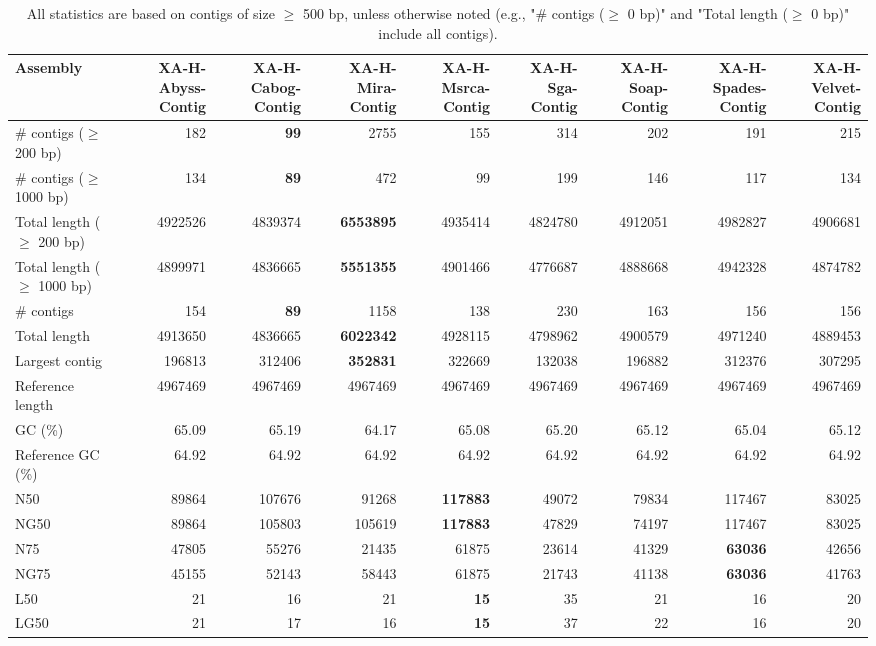 \documentclass[12pt,a4paper]{article}
\begin{document}
\begin{table}[ht]
\begin{center}
\caption{All statistics are based on contigs of size $\geq$ 500 bp, unless otherwise noted (e.g., "\# contigs ($\geq$ 0 bp)" and "Total length ($\geq$ 0 bp)" include all contigs).}
\begin{tabular}{|l*{8}{|r}|}
\hline
Assembly & XA-H-Abyss-Contig & XA-H-Cabog-Contig & XA-H-Mira-Contig & XA-H-Msrca-Contig & XA-H-Sga-Contig & XA-H-Soap-Contig & XA-H-Spades-Contig & XA-H-Velvet-Contig \\ \hline
\# contigs ($\geq$ 200 bp) & 182 & {\bf 99} & 2755 & 155 & 314 & 202 & 191 & 215 \\ \hline
\# contigs ($\geq$ 1000 bp) & 134 & {\bf 89} & 472 & 99 & 199 & 146 & 117 & 134 \\ \hline
Total length ($\geq$ 200 bp) & 4922526 & 4839374 & {\bf 6553895} & 4935414 & 4824780 & 4912051 & 4982827 & 4906681 \\ \hline
Total length ($\geq$ 1000 bp) & 4899971 & 4836665 & {\bf 5551355} & 4901466 & 4776687 & 4888668 & 4942328 & 4874782 \\ \hline
\# contigs & 154 & {\bf 89} & 1158 & 138 & 230 & 163 & 156 & 156 \\ \hline
Total length & 4913650 & 4836665 & {\bf 6022342} & 4928115 & 4798962 & 4900579 & 4971240 & 4889453 \\ \hline
Largest contig & 196813 & 312406 & {\bf 352831} & 322669 & 132038 & 196882 & 312376 & 307295 \\ \hline
Reference length & 4967469 & 4967469 & 4967469 & 4967469 & 4967469 & 4967469 & 4967469 & 4967469 \\ \hline
GC (\%) & 65.09 & 65.19 & 64.17 & 65.08 & 65.20 & 65.12 & 65.04 & 65.12 \\ \hline
Reference GC (\%) & 64.92 & 64.92 & 64.92 & 64.92 & 64.92 & 64.92 & 64.92 & 64.92 \\ \hline
N50 & 89864 & 107676 & 91268 & {\bf 117883} & 49072 & 79834 & 117467 & 83025 \\ \hline
NG50 & 89864 & 105803 & 105619 & {\bf 117883} & 47829 & 74197 & 117467 & 83025 \\ \hline
N75 & 47805 & 55276 & 21435 & 61875 & 23614 & 41329 & {\bf 63036} & 42656 \\ \hline
NG75 & 45155 & 52143 & 58443 & 61875 & 21743 & 41138 & {\bf 63036} & 41763 \\ \hline
L50 & 21 & 16 & 21 & {\bf 15} & 35 & 21 & 16 & 20 \\ \hline
LG50 & 21 & 17 & 16 & {\bf 15} & 37 & 22 & 16 & 20 \\ \hline

\end{tabular}
\end{center}
\end{table}
\end{document}
